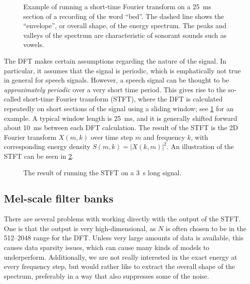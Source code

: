 
\begin{figure}
  \centering
  
  \caption{\label{fig:sftf}Example of running a short-time Fourier transform on a \SI{25}{\ms} section of a recording of the word ``bed''.
  The dashed line shows the ``envelope'', or overall shape, of the energy spectrum.
  The peaks and valleys of the spectrum are characteristic of sonorant sounds such as vowels.}
\end{figure}

The DFT makes certain assumptions regarding the nature of the signal.
In particular, it assumes that the signal is periodic, which is emphatically not true in general for speech signals.
However, a speech signal can be thought to be \emph{approximately periodic} over a very short time period.
This gives rise to the so-called short-time Fourier transform (STFT), where the DFT is calculated repeatedly on short sections of the signal using a sliding window; see \cref{fig:sftf} for an example.
A typical window length is \SI{25}{\ms}, and it is generally shifted forward about \SI{10}{\ms} between each DFT calculation.
The result of the STFT is the 2D Fourier transform $X(m,k)$ over time step $m$ and frequency $k$, with corresponding energy density $S(m,k) = \left|X(k,m)\right|^2$.
An illustration of the STFT can be seen in \cref{fig:spectrogram}.

\begin{figure}
  \centering

  \caption{\label{fig:spectrogram}The result of running the STFT on a \SI{3}{\s} long signal.}
\end{figure}

\subsection{Mel-scale filter banks}

There are several problems with working directly with the output of the STFT. One is that the output is very high-dimensional, as $N$ is often chosen to be in the \numrange{512}{2048} range for the DFT.
Unless very large amounts of data is available, this causes data sparsity issues, which can cause many kinds of models to underperform.
Additionally, we are not really interested in the exact energy at every frequency step, but 
would rather like to extract the overall shape of the spectrum, preferably in a way that also suppresses some of the noise.

